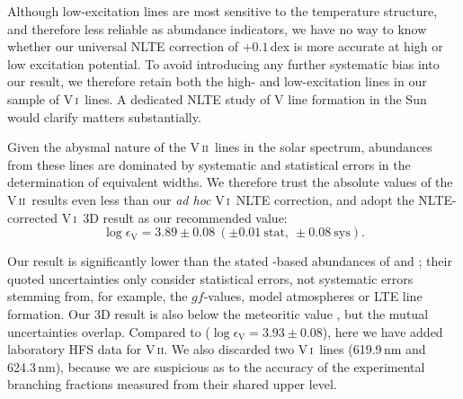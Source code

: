 \documentclass[traditabstract]{aa}
\newcommand{\altvi}{V\,\textsc{i}}
\newcommand{\altvii}{V\,\textsc{ii}}
\newcommand{\vi}{\altvi\ }
\newcommand{\vii}{\altvii\ }
\begin{document}
Although low-excitation lines are most sensitive to the temperature structure, and therefore less reliable as abundance indicators, we have no way to know whether our universal NLTE correction of $+0.1$\,dex is more accurate at high or low excitation potential.  To avoid introducing any further systematic bias into our result, we therefore retain both the high- and low-excitation lines in our sample of \vi lines.  A dedicated NLTE study of V line formation in the Sun would clarify matters substantially.

Given the abysmal nature of the \vii lines in the solar spectrum, abundances from these lines are dominated by systematic and statistical errors in the determination of equivalent widths.  We therefore trust the absolute values of the \vii results even less than our \textit{ad hoc} \vi NLTE correction, and adopt the NLTE-corrected \vi 3D result as our recommended value:
\begin{displaymath}
\log \epsilon_\mathrm{V}=3.89\pm0.08\ (\pm0.01\ \mathrm{stat},\ \pm0.08\ \mathrm{sys}).
\end{displaymath}

Our result is significantly lower than the stated -based abundances of \citet[][$3.99\pm0.01$]{Whaling85} and \citet[][$4.02\pm0.02$]{Biemont89}; their quoted uncertainties only consider statistical errors, not systematic errors stemming from, for example, the $gf$-values, model atmospheres or LTE line formation.  Our 3D result is also below the meteoritic value \citep[$3.96\pm0.02$;][]{Lodders09}, but the mutual uncertainties overlap.  Compared to  ($\log \epsilon_\mathrm{V}=3.93\pm0.08$), here we have added laboratory HFS data for \altvii.  We also discarded two \vi lines (619.9\,nm and 624.3\,nm), because we are suspicious as to the accuracy of the experimental branching fractions measured from their shared upper level.
\end{document}

